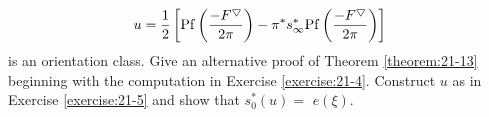 \begin{enumerate}[label=\theexercise.\arabic*.,ref=\theexercise.\arabic*,leftmargin=2.7em]
    \[
      u = \frac{1}{2}\left[\mathrm{Pf}\left( \frac{-F^\bigtriangledown }{2\pi }\right) - {\pi }^*{s}_{\infty }^*\mathrm{Pf}\left( \frac{-F^\bigtriangledown }{2\pi }\right)\right]
    \]
    is an orientation class.
  \NewItem Give an alternative proof of Theorem \ref{theorem:21-13} beginning with the computation in Exercise \ref{exercise:21-4}. Construct $u$ as in Exercise \ref{exercise:21-5} and show that ${s}_{0}^*( u)  =$  $e( \xi )$.
\end{enumerate}
